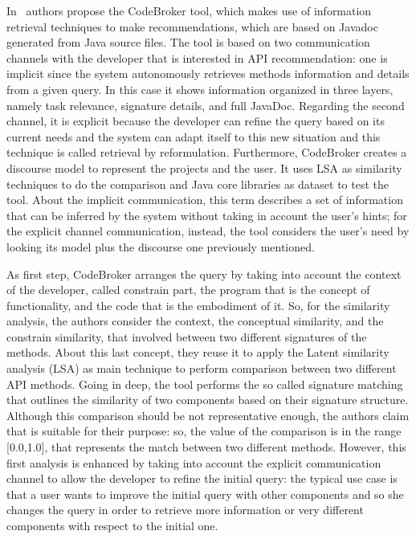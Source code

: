 In~\cite{ye_reuse-conducive_2005} authors propose the CodeBroker tool, which 
makes use of information retrieval techniques to make recommendations, which 
are based on Javadoc generated from Java source files. The tool is based on two 
communication channels with the developer that is interested in API 
recommendation: one is implicit since the system autonomously retrieves methods 
information and details from a given query. In this case it shows information 
organized in three layers, namely task relevance, signature details, and full 
JavaDoc. Regarding the second channel, it is explicit because the developer can 
refine the query based on its current needs and the system can adapt itself to 
this new situation and this technique is called retrieval by reformulation. 
Furthermore, CodeBroker creates a discourse model to represent the projects and 
the user. It uses LSA as similarity techniques to do the comparison and Java 
core libraries as dataset to test the tool. About the implicit communication, 
this term describes a set of information that can be inferred by the system 
without taking in account the user's hints; for the explicit channel 
communication, instead, the tool considers the user's need by looking its model 
plus the discourse one previously mentioned.

As first step, CodeBroker arranges the query by taking into account the context 
of the developer, called constrain part, the program that is the concept of 
functionality, and the code that is the embodiment of it. So, for the 
similarity analysis, the authors consider the context, the conceptual 
similarity, and the constrain similarity, that involved between two different 
signatures of the methods. About this last concept, they reuse it to apply the 
Latent similarity analysis (LSA) as main technique to perform comparison 
between two different API methods. Going in deep, the tool performs the so 
called signature matching that outlines the similarity of two components based 
on their signature structure. Although this comparison should be not 
representative enough, the authors claim that is suitable for their purpose: 
so, the value of the comparison is in the range [0.0,1.0], that represents the 
match between two different methods. However, this first analysis is enhanced 
by taking into account the explicit communication channel to allow the 
developer to refine the initial query: the typical use case is that a user 
wants to improve the initial query with other components and so she changes the 
query in order to retrieve more information or very different components with 
respect to the initial one. 

